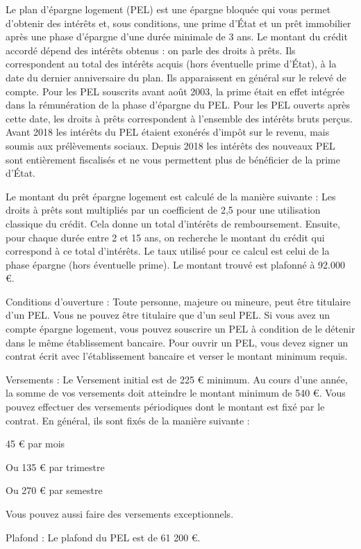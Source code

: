 \documentclass[12pt, a4paper]{book}
\begin{document}
{Le plan d'épargne logement (PEL) est une épargne bloquée qui vous permet d'obtenir des intérêts et, sous conditions, une prime d'État et un prêt immobilier après une phase d'épargne d'une durée minimale de 3 ans.
Le montant du crédit accordé dépend des intérêts obtenus : on parle des droits à prêts. Ils correspondent au total des intérêts acquis (hors éventuelle prime d'État), à la date du dernier anniversaire du plan. Ils apparaissent en général sur le relevé de compte. Pour les PEL souscrits avant août 2003, la prime était en effet intégrée dans la rémunération de la phase d'épargne du PEL. Pour les PEL ouverts après cette date, les droits à prêts correspondent à l'ensemble des intérêts bruts perçus.
Avant 2018 les intérêts du PEL étaient exonérés d'impôt sur le revenu, mais soumis aux prélèvements sociaux. Depuis 2018 les intérêts des nouveaux PEL sont entièrement fiscalisés et ne vous permettent plus de bénéficier de la prime d'État.

Le montant du prêt épargne logement est calculé de la manière suivante : Les droits à prêts sont multipliés par un coefficient de 2,5 pour une utilisation classique du crédit. Cela donne un total d'intérêts de remboursement. Ensuite, pour chaque durée entre 2 et 15 ans, on recherche le montant du crédit qui correspond à ce total d'intérêts. Le taux utilisé pour ce calcul est celui de la phase épargne (hors éventuelle prime). Le montant trouvé est plafonné à 92.000 €.

Conditions d'ouverture :  Toute personne, majeure ou mineure, peut être titulaire d'un PEL. Vous ne pouvez être titulaire que d'un seul PEL. Si vous avez un compte épargne logement, vous pouvez souscrire un PEL à condition de le détenir dans le même établissement bancaire. Pour ouvrir un PEL, vous devez signer un contrat écrit avec l'établissement bancaire et verser le montant minimum requis.

Versements :  Le Versement initial est de 225 € minimum. Au cours d'une année, la somme de vos versements doit atteindre le montant minimum de 540 €. Vous pouvez effectuer des versements périodiques dont le montant est fixé par le contrat. En général, ils sont fixés de la manière suivante :

45 € par mois

Ou 135 € par trimestre

Ou 270 € par semestre

Vous pouvez aussi faire des versements exceptionnels.

Plafond : Le plafond du PEL est de 61 200 €.

}
\end{document}

